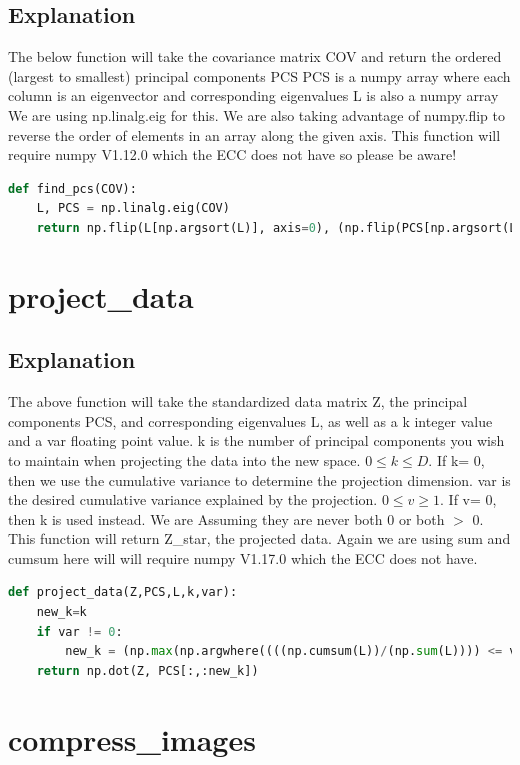 \documentclass{article}
\begin{document}
\subsection{Explanation}
The below function will take the covariance matrix COV and return the ordered (largest to smallest) principal components PCS
PCS is a numpy array where each column is an eigenvector and corresponding eigenvalues L is also a numpy array
We are using np.linalg.eig for this. We are also taking advantage of numpy.flip to reverse the order of elements in an array along the given axis. This function will require numpy V1.12.0 which the ECC does not have so please be aware!

\begin{lstlisting}[language=Python]
def find_pcs(COV):
	L, PCS = np.linalg.eig(COV)
	return np.flip(L[np.argsort(L)], axis=0), (np.flip(PCS[np.argsort(L)], axis=0)).transpose()
\end{lstlisting}

\section{project\_data}
\subsection{Explanation}
The above function will take the standardized data matrix Z, the principal components PCS, and corresponding eigenvalues L,
as well as a k integer value and a var ﬂoating point value. k is the number of principal components you wish to maintain
when projecting the data into the new space. $0 \leq  k \leq  D$. If k= 0, then we use the cumulative variance to determine the projection dimension.
var is the desired cumulative variance explained by the projection. $0 \leq  v \geq  1$.
If v= 0, then k is used instead. We are Assuming they are never both 0 or both $>$ 0. This function will return Z\_star, the projected data. Again we are using sum and cumsum here will will require numpy V1.17.0 which the ECC does not have.

\begin{lstlisting}[language=Python]
def project_data(Z,PCS,L,k,var):
	new_k=k
	if var != 0:
		new_k = (np.max(np.argwhere((((np.cumsum(L))/(np.sum(L)))) <= var)))
	return np.dot(Z, PCS[:,:new_k])
\end{lstlisting}

\section{compress\_images}
\end{document}
